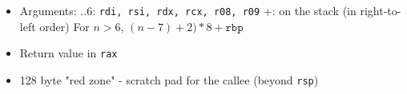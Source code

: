 \begin{itemize}
\begin{itemize}
		\item Arguments: ..6: \texttt{rdi, rsi, rdx, rcx, r08, r09} +: on the stack (in right-to-left order) \newline
		For $n > 6$, $(n-7) + 2) * 8 + \texttt{rbp}$
		
		\item Return value in \texttt{rax}

		\item 128 byte "red zone" - scratch pad for the callee (beyond \texttt{rsp})
	\end{itemize}
\end{itemize}
